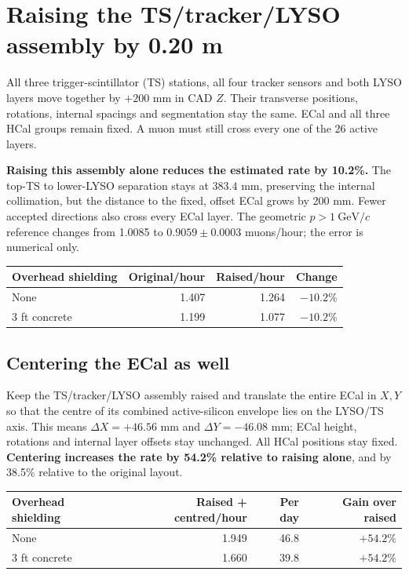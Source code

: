 \clearpage
\section*{Raising the TS/tracker/LYSO assembly by 0.20 m}
All three trigger-scintillator (TS) stations, all four tracker sensors and both
LYSO layers move together by $+200$ mm in CAD $Z$. Their transverse positions,
rotations, internal spacings and segmentation stay the same. ECal and all three
HCal groups remain fixed. A muon must still cross every one of the 26 active layers.

\textbf{Raising this assembly alone reduces the estimated rate by 10.2\%.}
The top-TS to lower-LYSO separation stays at $383.4$ mm, preserving the internal
collimation, but the distance to the fixed, offset ECal grows by 200 mm. Fewer
accepted directions also cross every ECal layer. The geometric
$p>1\ \mathrm{GeV}/c$ reference changes from 1.0085 to
$0.9059\pm0.0003$ muons/hour; the error is numerical only.

\begin{center}
\begin{tabular}{lrrr}
\toprule
Overhead shielding & Original/hour & Raised/hour & Change\\
\midrule
None & 1.407 & 1.264 & $-10.2\%$\\
3 ft concrete & 1.199 & 1.077 & $-10.2\%$\\
\bottomrule
\end{tabular}
\end{center}

\subsection*{Centering the ECal as well}
Keep the TS/tracker/LYSO assembly raised and translate the entire ECal in $X,Y$
so that the centre of its combined active-silicon envelope lies on the LYSO/TS
axis. This means $\Delta X=+46.56$ mm and $\Delta Y=-46.08$ mm; ECal height,
rotations and internal layer offsets stay unchanged. All HCal positions stay fixed.
\textbf{Centering increases the rate by 54.2\% relative to raising alone},
and by 38.5\% relative to the original layout.

\begin{center}
\begin{tabular}{lrrr}
\toprule
Overhead shielding & Raised + centred/hour & Per day & Gain over raised\\
\midrule
None & 1.949 & 46.8 & $+54.2\%$\\
3 ft concrete & 1.660 & 39.8 & $+54.2\%$\\
\bottomrule
\end{tabular}
\end{center}

